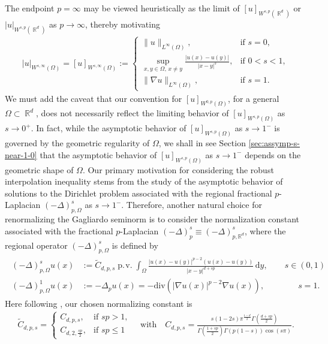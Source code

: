 \documentclass[12pt, reqno]{amsart}%
\theoremstyle{plain}  %
\theoremstyle{definition}  %
\theoremstyle{remark}
\numberwithin{equation}{section}
\DeclareMathOperator{\pv}{\operatorname{p.\!v.}}
\DeclareMathOperator{\R}{\mathbb{R}}
\renewcommand{\d}{\,\mathrm{d}}
\begin{document}
The endpoint $p = \infty$ may be viewed heuristically as the limit of $ [u]_{W^{s,p}(\R^d)}$ or $|u|_{W^{s,p}(\R^d)}$ as $p \to \infty$, thereby motivating
\begin{align*}
|u|_{W^{s,\infty}(\Omega)}= [u]_{W^{s,\infty}(\Omega)} :=
\begin{cases}
\displaystyle \|u\|_{L^\infty(\Omega)}, & \text{if } s = 0, \\
\displaystyle \sup_{x,y\in \Omega,\,x \neq y} \frac{|u(x) - u(y)|}{|x-y|^s}, & \text{if } 0 < s < 1, \\
\displaystyle \|\nabla u\|_{L^\infty(\Omega)}, & \text{if }s = 1.
\end{cases}
\end{align*}
We must add the caveat that our convention for $[u]_{W^{0,p}(\Omega)}$, for a general $\Omega \subset \R^d$, does not necessarily reflect the limiting behavior of  $[u]_{W^{s,p}(\Omega)}$ as $s \to 0^+$.
In fact, while the asymptotic behavior of $[u]_{W^{s,p}(\Omega)}$ as $s \to 1^-$ is governed by the geometric regularity of $\Omega$, we shall in see Section \ref{sec:assymp-s-near-1-0} that the asymptotic behavior of $[u]_{W^{s,p}(\Omega)}$ as $s \to 1^-$  depends on the geometric shape of $\Omega$.
\noindent Our primary motivation for considering the robust interpolation inequality stems from the study of the asymptotic behavior of solutions to the Dirichlet problem associated with the regional fractional $p$-Laplacian $(-\Delta)^s_{p,\Omega}$ as $s\to 1^-$. Therefore, another natural choice for renormalizing the Gagliardo seminorm is to consider the normalization constant associated with the fractional $p$-Laplacian $(-\Delta)^s_p \equiv (-\Delta)^s_{p,\mathbb{R}^d}$, where the regional operator $(-\Delta)^s_{p,\Omega} $ is defined by
\begin{align*}
\begin{split}
(-\Delta)^s_{p,\Omega} u(x)
&:= \widetilde{C}_{d,p,s}\pv \int_{\Omega}\frac{|u(x)-u(y)|^{p-2} (u(x)-u(y))}{|x-y|^{d+sp}}\d y,\qquad s\in (0,1)\\
(-\Delta)^1_{p,\Omega} u(x)
&:= -\Delta_p u(x)	=-\mathrm{div}(|\nabla u(x)|^{p-2}\nabla u(x)), \qquad \qquad s=1.
\end{split}
\end{align*}
Here following \cite{Fog25}, our chosen normalizing constant is
\begin{align}\label{eq:normalized-frac-cons}
\widetilde{C}_{d,p,s} =
\begin{cases}
C_{d,p,s}, & \text{if } sp > 1, \\
C_{d,2,\frac{sp}{2}}, & \text{if } sp \leq 1
\end{cases}
\quad \text{with}\quad
C_{d,p,s}= \frac{s(1-2s)\pi^{\frac{1-d}{2}}\Gamma(\frac{d+sp}{2})}{\Gamma(\frac{1+s p}{2})\Gamma(p(1-s)) \cos(s\pi)}.
\end{align}
\end{document}
